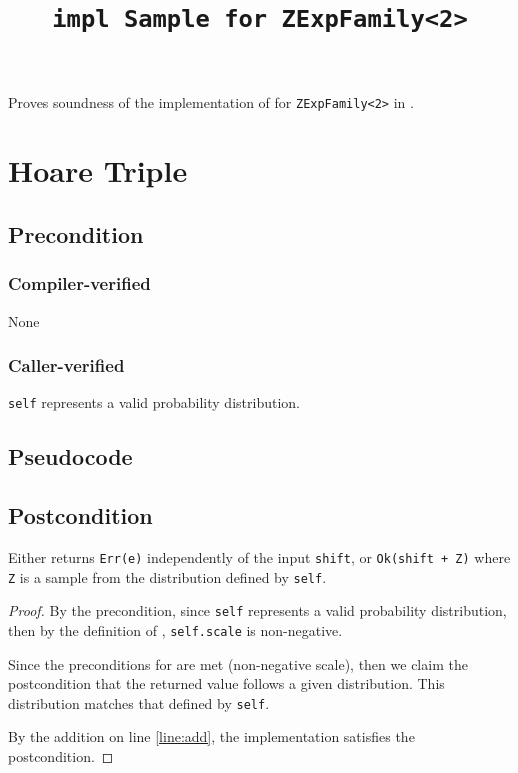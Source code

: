 \documentclass{article}
\title{\texttt{impl Sample for ZExpFamily<2>}}
\author{\MichaelShoemateAuthor}
\date{}
\begin{document}
\maketitle
\contrib
Proves soundness of the implementation of  for \texttt{ZExpFamily<2>} in .

\section{Hoare Triple}
\subsection*{Precondition}
\subsubsection*{Compiler-verified}
None

\subsubsection*{Caller-verified}
\texttt{self} represents a valid probability distribution.

\subsection*{Pseudocode}


\subsection*{Postcondition}
\begin{theorem}
    \label{postcondition}
    Either returns \texttt{Err(e)} independently of the input \texttt{shift},
    or \texttt{Ok(shift + Z)} where \texttt{Z} is a sample from the distribution defined by \texttt{self}.
\end{theorem}

\begin{proof}
    By the precondition, since \texttt{self} represents a valid probability distribution,
    then by the definition of ,
    \texttt{self.scale} is non-negative.

    Since the preconditions for  are met (non-negative scale),
    then we claim the postcondition that the returned value follows a given distribution.
    This distribution matches that defined by \texttt{self}.

    By the addition on line \ref{line:add}, the implementation satisfies the postcondition.
\end{proof}
\end{document}
